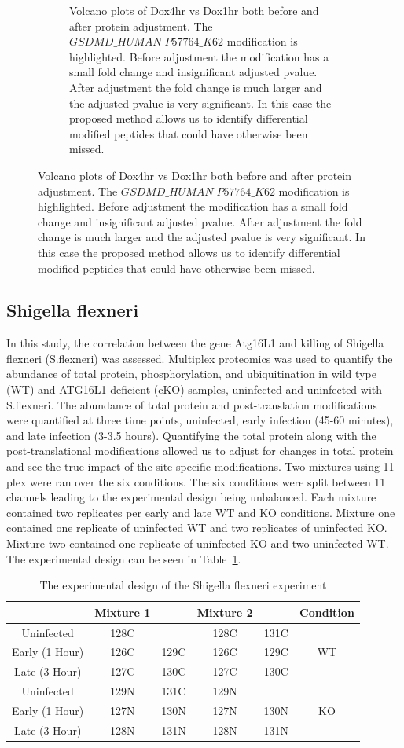 \documentclass{mcp}
\begin{document}
\begin{figure}[h!]
\begin{subfigure}{\textwidth}
	\caption{Volcano plots of Dox4hr vs Dox1hr both before and after protein adjustment. The $GSDMD\_HUMAN|P57764\_K62$ modification is highlighted. Before adjustment the modification has a small fold change and insignificant adjusted pvalue. After adjustment the fold change is much larger and the adjusted pvalue is very significant. In this case the proposed method allows us to identify differential modified peptides that could have otherwise been missed.}
 \end{subfigure}
\label{fig:ipah_figures}
\end{figure}

\clearpage
\subsection{Shigella flexneri}

In this study, the correlation between the gene Atg16L1 and killing of Shigella flexneri (S.flexneri) was assessed. Multiplex proteomics was used to quantify the abundance of total protein, phosphorylation, and ubiquitination in wild type (WT) and ATG16L1-deficient (cKO) samples, uninfected and uninfected with S.flexneri. The abundance of total protein and post-translation modifications were quantified at three time points, uninfected, early infection (45-60 minutes), and late infection (3-3.5 hours). Quantifying the total protein along with the post-translational modifications allowed us to adjust for changes in total protein and see the true impact of the site specific modifications. Two mixtures using 11-plex were ran over the six conditions. The six conditions were split between 11 channels leading to the experimental design being unbalanced. Each mixture contained two replicates per early and late WT and KO conditions. Mixture one contained one replicate of uninfected WT and two replicates of uninfected KO. Mixture two contained one replicate of uninfected KO and two uninfected WT. The experimental design can be seen in Table~\ref{table:shigella_design}.

\begin{table}[h!]
\centering
\begin{tabular}{|c | c c | c c | c|}
\hline
 & Mixture 1 & & Mixture 2 & & Condition \\ [0.5ex]
 \hline\hline
 Uninfected & 128C & & 128C & 131C & \\
 \hline
Early (1 Hour) & 126C & 129C & 126C & 129C & WT \\
\hline
Late (3 Hour) & 127C & 130C & 127C & 130C & \\
\hline
Uninfected & 129N & 131C & 129N & & \\
\hline
Early (1 Hour) & 127N & 130N & 127N & 130N & KO \\
\hline
Late (3 Hour) & 128N & 131N & 128N & 131N & \\
\hline

\end{tabular}
\caption{The experimental design of the Shigella flexneri experiment}
\label{table:shigella_design}
\end{table}
\end{document}
